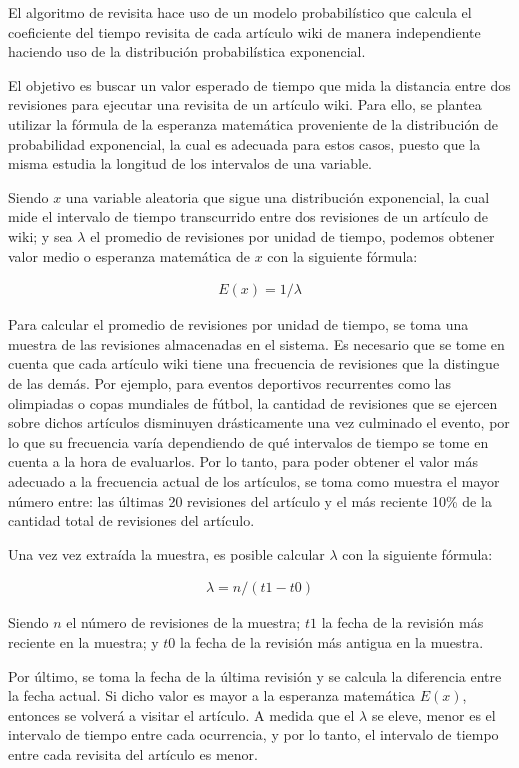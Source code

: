 El algoritmo de revisita hace uso de un modelo probabilístico que calcula el coeficiente del tiempo revisita de cada artículo wiki de manera independiente haciendo uso de la distribución probabilística exponencial.

El objetivo es buscar un valor esperado de tiempo que mida la distancia entre dos revisiones para ejecutar una revisita de un artículo wiki.
Para ello, se plantea utilizar la fórmula de la esperanza matemática proveniente de la distribución de probabilidad exponencial, la cual es adecuada para estos casos, puesto que la misma estudia la longitud de los intervalos de una variable.

Siendo $x$  una variable aleatoria que sigue una distribución exponencial, la cual mide el intervalo de tiempo transcurrido entre dos revisiones de un artículo de wiki;
y sea $\lambda$ el promedio de revisiones por unidad de tiempo, podemos obtener valor medio o esperanza  matemática de $x$ con la siguiente fórmula:

\begin{gather*}
E(x) = 1 / \lambda
\end{gather*}

Para calcular el promedio de revisiones por unidad de tiempo, se toma una muestra de las revisiones almacenadas en el sistema.
Es necesario que se tome en cuenta que cada artículo wiki tiene una frecuencia de revisiones que la distingue de las demás.
Por ejemplo, para eventos deportivos recurrentes como las olimpiadas o copas mundiales de fútbol, la cantidad de revisiones que se ejercen sobre dichos artículos disminuyen drásticamente una vez culminado el evento, por lo que su frecuencia varía dependiendo de qué intervalos de tiempo se tome en cuenta a la hora de evaluarlos.
Por lo tanto, para poder obtener el valor más adecuado a la frecuencia actual de los artículos, se toma como muestra el mayor número entre: las últimas 20 revisiones del artículo y el más reciente 10\% de la cantidad total de revisiones del artículo.

Una vez vez extraída la muestra, es posible calcular $\lambda$ con la siguiente fórmula:

\begin{gather*}
\lambda = n / (t1 - t0)
\end{gather*}

Siendo $n$ el número de revisiones de la muestra;
$t1$ la fecha de la revisión más reciente en la muestra;
y $t0$ la fecha de la revisión más antigua en la muestra.

Por último, se toma la fecha de la última revisión y se calcula la diferencia entre la fecha actual.
Si dicho valor es mayor a la esperanza matemática $E(x)$, entonces se volverá a visitar el artículo.
A medida que el $\lambda$ se eleve, menor es el intervalo de tiempo entre cada ocurrencia, y por lo tanto, el intervalo de tiempo entre cada revisita del artículo es menor.

